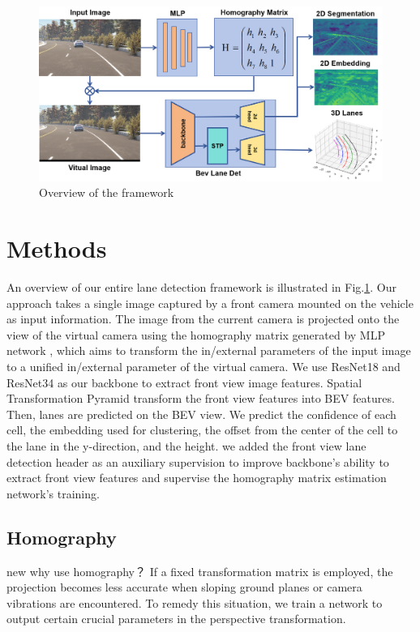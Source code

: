 
\begin{figure}[ht]
    \centering
    \includegraphics[height=0.45\textheight]{asset/structure} %
    \caption{Overview of the framework}
    \label{fig:overview}
\end{figure}

\section{Methods}
\label{sec:methods}
An overview of our entire lane detection framework is illustrated in Fig.\ref{fig:overview}.
Our approach takes a single image captured by a front camera mounted on the vehicle as input information.
The image from the current camera is projected onto the view of the virtual camera using the homography
matrix generated by MLP network \cite{tang2022image},
which aims to transform the in/external parameters of the input image to a unified
in/external parameter of the virtual camera.
We use ResNet18 and ResNet34 \cite{he2016deep} as our backbone to extract front view image features.
Spatial Transformation Pyramid \cite{wang2023bev} transform the front view features into BEV features.
Then, lanes are predicted on the BEV view. We predict the confidence of each cell, the embedding used for clustering,
the offset from the center of the cell to the lane in the y-direction, and the height.
we added the front view lane detection header as an
auxiliary supervision to improve backbone's ability to extract front view features
and supervise the homography matrix estimation network's training.

\subsection{Homography}
new
why use homography？
If a fixed transformation matrix is employed, the projection becomes less accurate when sloping ground planes or camera vibrations are encountered.
To remedy this situation, we train a network to output certain crucial parameters in the perspective transformation.

